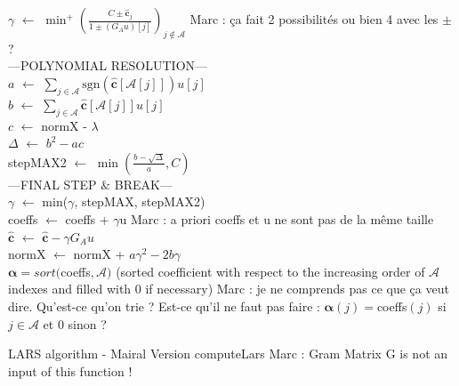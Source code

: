 \documentclass{ipol}
\newcommand{\code}{\bm{\alpha}}
\newcommand{\clars}{\hat{\textbf{c}}}
\newcommand{\A}{\mathcal{A}}
\begin{document}
\begin{algorithm}[H]
{	$\gamma$ $\leftarrow$ $\min^+\left(\frac{C \pm \clars_j}{1 \pm (G_Au)[j]}\right)_{j \notin \A}$ {\color{blue} Marc : \c ca fait 2 possibilit\'es ou bien 4 avec les $\pm$ ?}\\
	---POLYNOMIAL RESOLUTION---\\
	$a$ $\leftarrow$ $\sum_{j \in \A} \text{sgn}(\clars[\A[j]])u[j]$\\
	$b$ $\leftarrow$ $\sum_{j \in \A} \clars[\A[j]] u[j]$\\
	$c$ $\leftarrow$ normX - $\lambda$\\
	$\Delta$ $\leftarrow$ $b^2 - ac$ \\
	stepMAX2 $\leftarrow$ $\min(\frac{b - \sqrt{\Delta}}{a}, C)$ \\
	---FINAL STEP $\&$ BREAK---\\
	$\gamma$ $\leftarrow$ min($\gamma$, stepMAX, stepMAX2)\\
	coeffs $\leftarrow$ coeffs + $\gamma$u {\color{blue} Marc : a priori coeffs et u ne sont pas de la m\^eme taille}\\
	$\clars$ $\leftarrow$ $\clars - \gamma G_Au$ \\
	normX $\leftarrow$ normX + $a\gamma^2 - 2b\gamma$ \\
}
\Return $\code = sort($coeffs$, \A)$ (sorted coefficient with respect to the increasing order of $\A$ indexes and filled with 0 if necessary) {\color{blue} Marc : je ne comprends pas ce que \c ca veut dire. Qu'est-ce qu'on trie ? Est-ce qu'il ne faut pas faire : $\code(j)=$coeffs$(j)$ si $j\in\A$ et $0$ sinon ?}
	
\caption{LARS algorithm - Mairal Version {\color{red} computeLars} {\color{blue} Marc : Gram Matrix G is not an input of this function !}}

\end{algorithm}

\newpage
\end{document}
